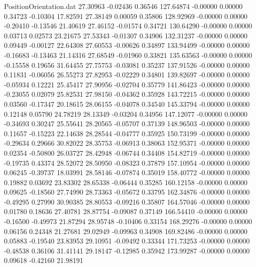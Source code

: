 \begin{filecontents}{PositionOrientation.dat}
  27.30963   -0.02436    0.36546   127.64874   -0.00000    0.00000    0.34723   -0.10304   17.82591
  27.38149    0.00059    0.35806   128.92969   -0.00000    0.00000   -0.20410   -0.13546   21.40619
  27.46152   -0.01574    0.34721   130.64290   -0.00000    0.00000    0.03713    0.02573   23.21675
  27.53343   -0.01307    0.34906   132.31237   -0.00000    0.00000    0.09449   -0.00127   22.64308
  27.60553   -0.00626    0.34897   133.94499   -0.00000    0.00000   -0.16683   -0.13463   21.14316
  27.68549   -0.01960    0.33821   135.63563   -0.00000    0.00000   -0.15558    0.19656   31.64455
  27.75753   -0.03081    0.35237   137.91526   -0.00000    0.00000    0.11831   -0.06056   26.55273
  27.82953   -0.02229    0.34801   139.82697   -0.00000    0.00000   -0.05934    0.12221   25.45417
  27.90956   -0.02704    0.35779   141.86423   -0.00000    0.00000   -0.23055    0.02079   25.82531
  27.98150   -0.04362    0.35928   143.72215   -0.00000    0.00000    0.03560   -0.17347   20.18615
  28.06155   -0.04078    0.34540   145.33794   -0.00000    0.00000    0.12148    0.05790   24.78219
  28.13349   -0.03204    0.34956   147.12077   -0.00000    0.00000   -0.34693    0.30247   25.55641
  28.20565   -0.05707    0.37139   148.96503   -0.00000    0.00000    0.11657   -0.15223   22.14638
  28.28544   -0.04777    0.35925   150.73199   -0.00000    0.00000   -0.29634    0.29666   30.82022
  28.35753   -0.06913    0.38063   152.95371   -0.00000    0.00000    0.02354   -0.50800   26.03727
  28.42948   -0.06744    0.34408   154.82719   -0.00000    0.00000   -0.19735    0.43374   28.52072
  28.50950   -0.08323    0.37879   157.10954   -0.00000    0.00000    0.06245   -0.39737   18.03991
  28.58146   -0.07874    0.35019   158.40772   -0.00000    0.00000    0.19882    0.03692   23.83302
  28.65338   -0.06444    0.35285   160.12158   -0.00000    0.00000    0.09625   -0.18560   27.74990
  28.73363   -0.05672    0.33795   162.34876   -0.00000    0.00000   -0.49295    0.27990   30.90385
  28.80553   -0.09216    0.35807   164.57046   -0.00000    0.00000    0.01780    0.18636   27.40781
  28.87754   -0.09087    0.37149   166.54410   -0.00000    0.00000   -0.16500   -0.49973   21.87294
  28.95748   -0.10406    0.33154   168.29276   -0.00000    0.00000    0.06156    0.24348   21.27681
  29.02949   -0.09963    0.34908   169.82486   -0.00000    0.00000    0.05883   -0.19540   23.83953
  29.10951   -0.09492    0.33344   171.73253   -0.00000    0.00000   -0.48538    0.36106   31.41141
  29.18147   -0.12985    0.35942   173.99287   -0.00000    0.00000    0.09618   -0.42160   21.98191

\end{filecontents}
